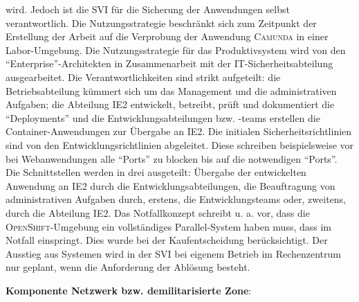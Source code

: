 wird. Jedoch ist die \ac{SVI} für die Sicherung der Anwendungen selbst verantwortlich. Die Nutzungsstrategie beschränkt sich zum Zeitpunkt der Erstellung der Arbeit auf die Verprobung der Anwendung \textsc{Camunda} in einer Labor-Umgebung. Die Nutzungsstrategie für das Produktivsystem wird von den \enquote{Enterprise}-Architekten in Zusammenarbeit mit der IT-Sicherheitsabteilung ausgearbeitet. Die Verantwortlichkeiten sind strikt aufgeteilt: die Betriebsabteilung kümmert sich um das Management und die administrativen Aufgaben; die Abteilung \ac{IE2} entwickelt, betreibt, prüft und dokumentiert die \enquote{Deployments} und die Entwicklungsabteilungen bzw. -teams erstellen die Container-Anwendungen zur Übergabe an \ac{IE2}. Die initialen Sicherheitsrichtlinien sind von den Entwicklungsrichtlinien abgeleitet. Diese schreiben beispielsweise vor bei Webanwendungen alle \enquote{Ports} zu blocken bis auf die notwendigen \enquote{Ports}. Die Schnittstellen werden in drei ausgeteilt: Übergabe der entwickelten Anwendung an \ac{IE2} durch die Entwicklungsabteilungen, die Beauftragung von administrativen Aufgaben durch, erstens, die Entwicklungsteams oder, zweitens, durch die Abteilung \ac{IE2}. Das Notfallkonzept schreibt u. a. vor, dass die \textsc{OpenShift}-Umgebung ein vollständiges Parallel-System haben muss, dass im Notfall einspringt. Dies wurde bei der Kaufentscheidung berücksichtigt. Der Ausstieg aus Systemen wird in der \ac{SVI} bei eigenem Betrieb im Rechenzentrum nur geplant, wenn die Anforderung der Ablösung besteht.
\par
\textbf{Komponente Netzwerk bzw. demilitarisierte Zone}:
\par
